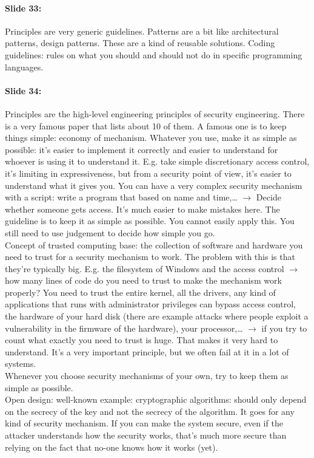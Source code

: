 \documentclass[10pt,a4paper]{report}
\begin{document}
\paragraph{Slide 33:} Principles are very generic guidelines. Patterns are a bit like architectural patterns, design patterns. These are a kind of reusable solutions. Coding guidelines: rules on what you should and should not do in specific programming languages.

\paragraph{Slide 34:} Principles are the high-level engineering principles of security engineering. There is a very famous paper that lists about 10 of them. A famous one is to keep things simple: economy of mechanism. Whatever you use, make it as simple as possible: it's easier to implement it correctly and easier to understand for whoever is using it to understand it. E.g. take simple discretionary access control, it's limiting in expressiveness, but from a security point of view, it's easier to understand what it gives you. You can have a very complex security mechanism with a script: write a program that based on name and time,… $\rightarrow$ Decide whether someone gets access. It's much easier to make mistakes here. The guideline is to keep it as simple as possible. You cannot easily apply this. You still need to use judgement to decide how simple you go.\\
Concept of trusted computing base: the collection of software and hardware you need to trust for a security mechanism to work. The problem with this is that they're typically big. E.g. the filesystem of Windows and the access control $\rightarrow$ how many lines of code do you need to trust to make the mechanism work properly? You need to trust the entire kernel, all the drivers, any kind of applications that runs with administrator privileges can bypass access control, the hardware of your hard disk (there are example attacks where people exploit a vulnerability in the firmware of the hardware), your processor,… $\rightarrow$ if you try to count what exactly you need to trust is huge. That makes it very hard to understand. It's a very important principle, but we often fail at it in a lot of systems. \\
Whenever you choose security mechanisms of your own, try to keep them as simple as possible.\\
Open design: well-known example: cryptographic algorithms: should only depend on the secrecy of the key and not the secrecy of the algorithm. It goes for any kind of security mechanism. If you can make the system secure, even if the attacker understands how the security works, that's much more secure than relying on the fact that no-one knows how it works (yet).
\end{document}
